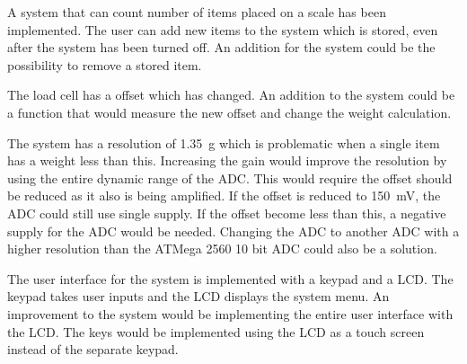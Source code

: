 A system that can count number of items placed on a scale has been implemented. 
The user can add new items to the system which is stored, even after the system has been turned off. 
An addition for the system could be the possibility to remove a stored item.

The load cell has a offset which has changed. 
An addition to the system could be a function that would measure the new offset and change the weight calculation.
 
The system has a resolution of \SI{1.35}{\gram} which is problematic when a single item has a weight less than this. 
Increasing the gain would improve the resolution by using the entire dynamic range of the ADC.
This would require the offset should be reduced as it also is being amplified. 
If the offset is reduced to \SI{150}{\milli\volt}, the ADC could still use single supply. \cite[p.~12]{ATmega2560}
If the offset become less than this, a negative supply for the ADC would be needed.
Changing the ADC to another ADC with a higher resolution than the ATMega 2560 10 bit ADC could also be a solution. 

The user interface for the system is implemented with a keypad and a LCD. 
The keypad takes user inputs and the LCD displays the system menu. 
An improvement to the system would be implementing the entire user interface with the LCD. 
The keys would be implemented using the LCD as a touch screen instead of the separate keypad.
